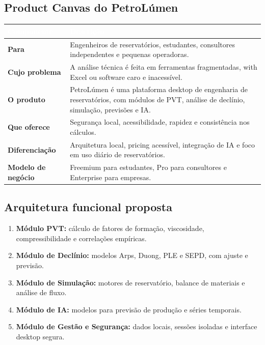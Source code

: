 \documentclass[11pt,a4paper]{article}
\begin{document}
\subsection{Product Canvas do PetroLúmen}
\begin{table}[H]
\centering
\renewcommand{\arraystretch}{1.25}
\begin{tabularx}{\textwidth}{|l|X|}
\hline
\rowcolor{petrolblue}\textcolor{white}{\textbf{Componente}} & \textcolor{white}{\textbf{Descrição}} \\
\hline
\textbf{Para} & Engenheiros de reservatórios, estudantes, consultores independentes e pequenas operadoras. \\
\hline
\textbf{Cujo problema} & A análise técnica é feita em ferramentas fragmentadas, with Excel ou software caro e inacessível. \\
\hline
\textbf{O produto} & PetroLúmen é uma plataforma desktop de engenharia de reservatórios, com módulos de PVT, análise de declínio, simulação, previsões e IA. \\
\hline
\textbf{Que oferece} & Segurança local, acessibilidade, rapidez e consistência nos cálculos. \\
\hline
\textbf{Diferenciação} & Arquitetura local, pricing acessível, integração de IA e foco em uso diário de reservatórios. \\
\hline
\textbf{Modelo de negócio} & Freemium para estudantes, Pro para consultores e Enterprise para empresas. \\
\hline
\end{tabularx}
\end{table}

\subsection{Arquitetura funcional proposta}
\begin{enumerate}
    \item \textbf{Módulo PVT:} cálculo de fatores de formação, viscosidade, compressibilidade e correlações empíricas.
    \item \textbf{Módulo de Declínio:} modelos Arps, Duong, PLE e SEPD, com ajuste e previsão.
    \item \textbf{Módulo de Simulação:} motores de reservatório, balance de materiais e análise de fluxo.
    \item \textbf{Módulo de IA:} modelos para previsão de produção e séries temporais.
    \item \textbf{Módulo de Gestão e Segurança:} dados locais, sessões isoladas e interface desktop segura.
\end{enumerate}
\end{document}
